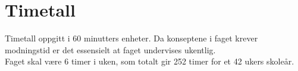 \section*{Timetall} \label{Sec: Timetall}


	Timetall oppgitt i 60 minutters enheter. Da konseptene i faget krever modningstid er det essensielt at faget undervises ukentlig.\\
	Faget skal være 6 timer i uken, som totalt gir 252 timer for et 42 ukers skoleår.
